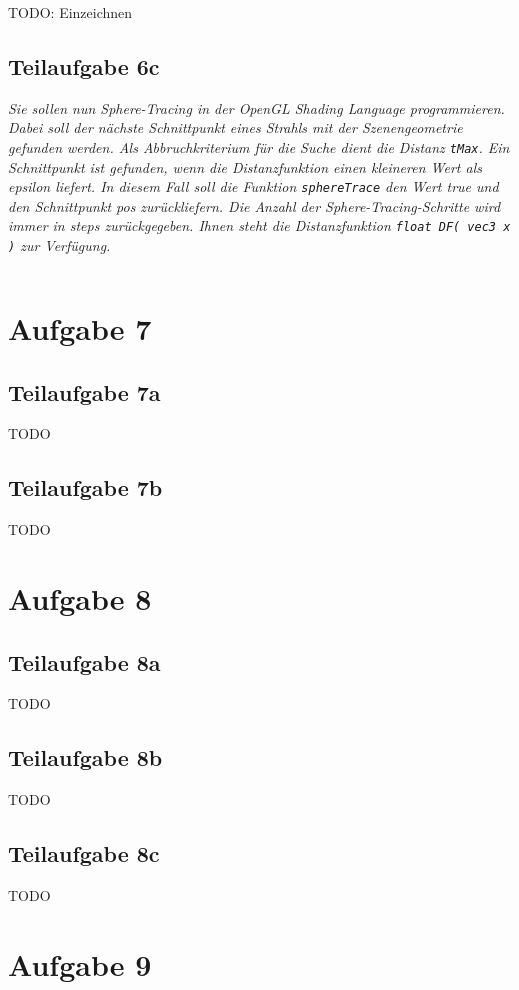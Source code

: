 \documentclass[a4paper]{scrartcl}
\begin{document}
TODO: Einzeichnen

\clearpage
\subsection*{Teilaufgabe 6c}
\textit{Sie sollen nun Sphere-Tracing in der OpenGL Shading Language
programmieren. Dabei soll der nächste Schnittpunkt eines Strahls mit der
Szenengeometrie gefunden werden. Als Abbruchkriterium für die Suche dient die
Distanz \texttt{tMax}. Ein Schnittpunkt ist gefunden, wenn die Distanzfunktion
einen kleineren Wert als epsilon liefert. In diesem Fall soll die Funktion
\texttt{sphereTrace} den Wert true und den Schnittpunkt pos zurückliefern. Die
Anzahl der Sphere-Tracing-Schritte wird immer in steps zurückgegeben. Ihnen
steht die Distanzfunktion \texttt{float DF( vec3 x )} zur Verfügung.}

\inputminted[linenos, numbersep=5pt, tabsize=4, frame=lines, label=spheretracing.frag]{glsl}{spheretracing.frag}

\clearpage
\section*{Aufgabe 7}
\subsection*{Teilaufgabe 7a}
TODO
\subsection*{Teilaufgabe 7b}
TODO

\section*{Aufgabe 8}
\subsection*{Teilaufgabe 8a}
TODO
\subsection*{Teilaufgabe 8b}
TODO
\subsection*{Teilaufgabe 8c}
TODO

\section*{Aufgabe 9}
\inputminted[linenos, numbersep=5pt, tabsize=4, frame=lines, label=keyframing.vert]{glsl}{keyframing.vert}
\end{document}
